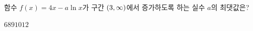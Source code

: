 함수 $f(x)=4x-a\ln x$가 구간 $(3{,}\mkern3mu\mathopen{}\infty)$에서 증가하도록 하는 실수 $a$의 최댓값은?
\begin{choices32}{$6$}{$8$}{$9$}{$10$}{$12$}\end{choices32}
